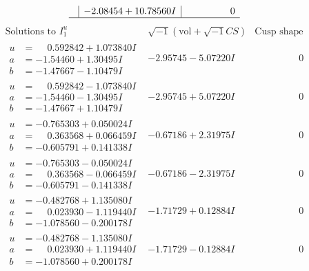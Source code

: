 \documentclass[1p]{elsarticle_modified}
\theoremstyle{definition}
\newcommand{\I}{\sqrt{-1}}
\begin{document}
$$\begin{array}{c|c|c}
 & -2.08454 + 10.78560 I & \phantom{-0.000000 } 0\\
 \hline 
 \end{array}$$\newpage$$\begin{array}{c|c|c}  
\text{Solutions to }I^u_{1}& \I (\text{vol} + \sqrt{-1}CS) & \text{Cusp shape}\\
 \hline 
\begin{aligned}
u &= \phantom{-}0.592842 + 1.073840 I \\
a &= -1.54460 + 1.30495 I \\
b &= -1.47667 - 1.10479 I\end{aligned}
 & -2.95745 - 5.07220 I & \phantom{-0.000000 } 0 \\ \hline\begin{aligned}
u &= \phantom{-}0.592842 - 1.073840 I \\
a &= -1.54460 - 1.30495 I \\
b &= -1.47667 + 1.10479 I\end{aligned}
 & -2.95745 + 5.07220 I & \phantom{-0.000000 } 0 \\ \hline\begin{aligned}
u &= -0.765303 + 0.050024 I \\
a &= \phantom{-}0.363568 + 0.066459 I \\
b &= -0.605791 + 0.141338 I\end{aligned}
 & -0.67186 + 2.31975 I & \phantom{-0.000000 } 0 \\ \hline\begin{aligned}
u &= -0.765303 - 0.050024 I \\
a &= \phantom{-}0.363568 - 0.066459 I \\
b &= -0.605791 - 0.141338 I\end{aligned}
 & -0.67186 - 2.31975 I & \phantom{-0.000000 } 0 \\ \hline\begin{aligned}
u &= -0.482768 + 1.135080 I \\
a &= \phantom{-}0.023930 - 1.119440 I \\
b &= -1.078560 - 0.200178 I\end{aligned}
 & -1.71729 + 0.12884 I & \phantom{-0.000000 } 0 \\ \hline\begin{aligned}
u &= -0.482768 - 1.135080 I \\
a &= \phantom{-}0.023930 + 1.119440 I \\
b &= -1.078560 + 0.200178 I\end{aligned}
 & -1.71729 - 0.12884 I & \phantom{-0.000000 } 0 \\ \hline\begin{aligned}

\end{aligned}
\end{array}$$
\end{document}
